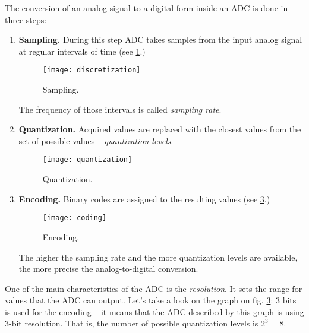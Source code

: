 \documentclass[../sparc.tex]{subfiles}
\begin{document}

The conversion of an analog signal to a digital form inside an ADC is done in
three steps:

\begin{enumerate}

\item \textbf{Sampling.}  During this step ADC takes samples from the input
  analog signal at regular intervals of time (see \ref{fig:discretization}.)

  \begin{figure}[h]
    \centering
    \texttt{[image: discretization]}
    \caption{Sampling.}
    \label{fig:discretization}
  \end{figure}

  The frequency of those intervals is called \emph{sampling rate}.

\item \textbf{Quantization.}  Acquired values are replaced with the closest
  values from the set of possible values -- \emph{quantization levels}.

  \begin{figure}[h]
    \texttt{[image: quantization]}
    \caption{Quantization.}
    \label{fig:quantization}
    \centering
  \end{figure}

\item \textbf{Encoding.}  Binary codes are assigned to the resulting values (see
  \ref{fig:coding}.)

  \begin{figure}[h]
    \texttt{[image: coding]}
    \caption{Encoding.}
    \label{fig:coding}
    \centering
  \end{figure}

  The higher the sampling rate and the more quantization levels are available,
  the more precise the analog-to-digital conversion.

\end{enumerate}

One of the main characteristics of the ADC is the \emph{resolution}.  It sets
the range for values that the ADC can output.  Let's take a look on the graph on
fig. \ref{fig:coding}: 3 bits is used for the encoding -- it means that the ADC
described by this graph is using 3-bit resolution.  That is, the number of
possible quantization levels is $2^3 = 8$.
\end{document}
